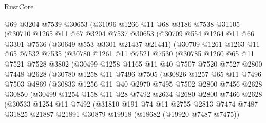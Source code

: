 \begin{lexlean}{RustCore}
\begin{coremodule}
    @69
    @3204
    @7539
    @30653
    (@31096
      @1266
      @11
      @68
      @3186
      @7538
      @31105
      (@30710
        @1265
        @11
        @67
        @3204
        @7537
        @30653
        (@30709
          @554
          @1264
          @11
          @66
          @3301
          @7536
          (@30649 @553 @3301 @21437 @21441)
          (@30709
            @1261
            @1263
            @11
            @65
            @7532
            @7535
            (@30780
              @1261
              @11
              @7521
              @7530
              (@30785
                @1260
                @65
                @11
                @7521
                @7528
                @3802
                (@30499
                  @1258
                  @1165
                  @11
                  @40
                  @7507
                  @7520
                  @7527
                  @2800
                  @7448
                  @2628
                  (@30780
                    @1258
                    @11
                    @7496
                    @7505
                    (@30826
                      @1257
                      @65
                      @11
                      @7496
                      @7503
                      @4869
                      (@30833
                        @1256
                        @11
                        @40
                        @2970
                        @7495
                        @7502
                        @2800
                        @7456
                        @2628
                        @30850
                        (@30499
                          @1254
                          @158
                          @11
                          @28
                          @7492
                          @2634
                          @2680
                          @2800
                          @7466
                          @2628
                          (@30533
                            @1254
                            @11
                            @7492
                            (@31810
                              @191
                              @74
                              @11
                              @2755
                              @2813
                              @7474
                              @7487
                              @31825
                              @21887
                              @21891
                              @30879
                              @19918
                              (@18682 (@19920 @7487 @7475))

\end{coremodule}
\end{lexlean}
